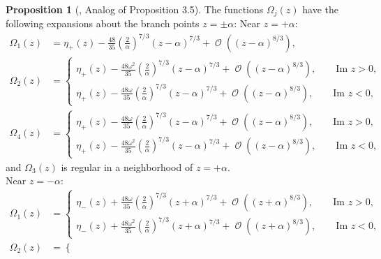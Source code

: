\documentclass[usenames,dvipsnames]{article}
\theoremstyle{definition}
\newtheorem{prop}{Proposition}[section]
\DeclareMathOperator{\OO}{\mathcal{O}}
\numberwithin{equation}{section}
\numberwithin{figure}{section}
\begin{document}
\begin{prop}[\cite{DHL1}, Analog of Proposition 3.5]\label{local-expansions-pm-alpha}
    The functions $\Omega_j(z)$ have the following expansions about the branch points $z = \pm \alpha$:
    Near $z = +\alpha$:
    \begin{align} 
            \Omega_{1}(z) &= \eta_+(z) -\frac{48}{35}\left(\frac{2}{\alpha}\right)^{7/3}(z-\alpha)^{7/3} + \OO\left((z-\alpha)^{8/3}\right),\label{Sheet1-alpha-plus}\\
            \Omega_{2}(z) &= \begin{cases}
                            \eta_+(z) -\frac{48 \omega^2}{35}\left(\frac{2}{\alpha}\right)^{7/3}(z-\alpha)^{7/3} + \OO\left((z-\alpha)^{8/3}\right), \qquad \text{Im } z > 0, \\
                            \eta_+(z) -\frac{48 \omega}{35}\left(\frac{2}{\alpha}\right)^{7/3}(z-\alpha)^{7/3} + \OO\left((z-\alpha)^{8/3}\right), \qquad \text{Im } z < 0,
                            \end{cases}\label{Sheet2-alpha-plus}\\
            \Omega_{4}(z) &= \begin{cases}
                            \eta_+(z) -\frac{48 \omega}{35}\left(\frac{2}{\alpha}\right)^{7/3}(z-\alpha)^{7/3} + \OO\left((z-\alpha)^{8/3}\right), \qquad \text{Im } z > 0, \\
                            \eta_+(z) -\frac{48 \omega^2}{35}\left(\frac{2}{\alpha}\right)^{7/3}(z-\alpha)^{7/3} + \OO\left((z-\alpha)^{8/3}\right), \qquad \text{Im } z < 0,
                            \end{cases}\label{Sheet4-alpha-plus}
        \end{align}
    and $\Omega_3(z)$ is regular in a neighborhood of $z = +\alpha$.\\
    Near $z = -\alpha$:
    \begin{align} 
            \Omega_{1}(z) &= \begin{cases}
                            \eta_-(z) +\frac{48 \omega}{35}\left(\frac{2}{\alpha}\right)^{7/3}(z+\alpha)^{7/3} + \OO\left((z+\alpha)^{8/3}\right), \qquad \text{Im } z > 0, \\
                            \eta_-(z) +\frac{48 \omega^2}{35}\left(\frac{2}{\alpha}\right)^{7/3}(z+\alpha)^{7/3} + \OO\left((z+\alpha)^{8/3}\right), \qquad \text{Im } z < 0,
                            \end{cases}\label{Sheet1-alpha-minus}\\
            \Omega_{2}(z) &= \begin{cases}

\end{cases}
\end{align}
\end{prop}
\end{document}
